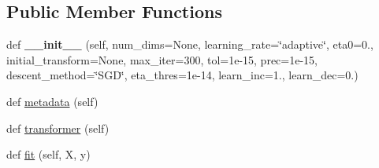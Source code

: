 \subsection*{Public Member Functions}
\begin{DoxyCompactItemize}
\item 
def {\bfseries \+\_\+\+\_\+init\+\_\+\+\_\+} (self, num\+\_\+dims=None, learning\+\_\+rate=\char`\"{}adaptive\char`\"{}, eta0=0., initial\+\_\+transform=None, max\+\_\+iter=300, tol=1e-\/15, prec=1e-\/15, descent\+\_\+method=\char`\"{}\+S\+G\+D\char`\"{}, eta\+\_\+thres=1e-\/14, learn\+\_\+inc=1., learn\+\_\+dec=0.)\hypertarget{classdml_1_1ncmml_1_1NCMML_ab8f65e9ec8d26077738d3773507c95af}{}\label{classdml_1_1ncmml_1_1NCMML_ab8f65e9ec8d26077738d3773507c95af}

\item 
def \hyperlink{classdml_1_1ncmml_1_1NCMML_a039f90483b5b4c964c937921f5c01abe}{metadata} (self)
\item 
def \hyperlink{classdml_1_1ncmml_1_1NCMML_aa2d6d578bc96c46689b8c185c3067df8}{transformer} (self)
\item 
def \hyperlink{classdml_1_1ncmml_1_1NCMML_a2c0c1cddd8eec63be977b3fb4866923a}{fit} (self, X, y)
\end{DoxyCompactItemize}
